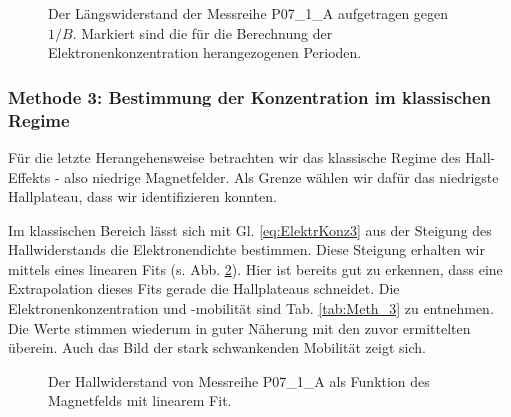 \begin{figure}[htbp]
	\centering
	
	\caption{Der Längswiderstand der Messreihe P07\_1\_A aufgetragen gegen $1/B$. Markiert sind die für die Berechnung der Elektronenkonzentration herangezogenen Perioden.}
	\label{abb:P07_Meth_2}
\end{figure}

\begin{table}[h!]
	\centering
	\caption{Bei Messreihe P07\_1\_A betrachtete Minima der SdH-Oszillation}
	
	\label{tab:P07_Meth_2}
\end{table}

\begin{table}[h!]
	\centering
	\caption{Die mit Methode 2 bestimmten E-konzentrationen und -mobilitäten}
	
	\label{tab:Meth_2}
\end{table}
\newpage
\subsubsection{Methode 3: Bestimmung der Konzentration im klassischen Regime}
Für die letzte Herangehensweise betrachten wir das klassische Regime des Hall-Effekts - also niedrige Magnetfelder. Als Grenze wählen wir dafür das niedrigste Hallplateau, dass wir identifizieren konnten.

Im klassischen Bereich lässt sich mit Gl. \ref{eq:ElektrKonz3} aus der Steigung des Hallwiderstands die Elektronendichte bestimmen. Diese Steigung erhalten wir mittels eines linearen Fits (s. Abb. \ref{abb:P07_Meth_3}). Hier ist bereits gut zu erkennen, dass eine Extrapolation dieses Fits gerade die Hallplateaus schneidet. Die Elektronenkonzentration und -mobilität sind Tab. \ref{tab:Meth_3} zu entnehmen. Die Werte stimmen wiederum in guter Näherung mit den zuvor ermittelten überein. Auch das Bild der stark schwankenden Mobilität zeigt sich.
\begin{figure}[htbp]
	\centering
	
	\caption{Der Hallwiderstand von Messreihe P07\_1\_A  als Funktion des Magnetfelds mit linearem Fit. }
	\label{abb:P07_Meth_3}
\end{figure}

\begin{table}[h]
	\centering
	\caption{Die mit Methode 3 bestimmten E-konzentrationen und -mobilitäten}
	
	\label{tab:Meth_3}
\end{table}

